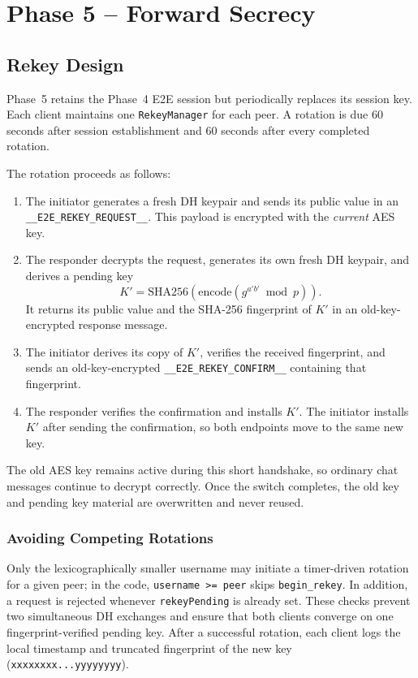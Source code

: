 \documentclass[11pt]{article}
\begin{document}
\section{Phase 5 -- Forward Secrecy}

\subsection{Rekey Design}

Phase~5 retains the Phase~4 E2E session but periodically replaces its session key. Each client maintains one \texttt{RekeyManager} for each peer. A rotation is due 60 seconds after session establishment and 60 seconds after every completed rotation.

The rotation proceeds as follows:

\begin{enumerate}
    \item The initiator generates a fresh DH keypair and sends its public value in an \texttt{\_\_E2E\_REKEY\_REQUEST\_\_}. This payload is encrypted with the \emph{current} AES key.
    \item The responder decrypts the request, generates its own fresh DH keypair, and derives a pending key
    \[
    K'=\mathrm{SHA256}(\mathrm{encode}(g^{a'b'}\bmod p)).
    \]
    It returns its public value and the SHA-256 fingerprint of $K'$ in an old-key-encrypted response message.
    \item The initiator derives its copy of $K'$, verifies the received fingerprint, and sends an old-key-encrypted \texttt{\_\_E2E\_REKEY\_CONFIRM\_\_} containing that fingerprint.
    \item The responder verifies the confirmation and installs $K'$. The initiator installs $K'$ after sending the confirmation, so both endpoints move to the same new key.
\end{enumerate}

The old AES key remains active during this short handshake, so ordinary chat messages continue to decrypt correctly. Once the switch completes, the old key and pending key material are overwritten and never reused.

\subsubsection{Avoiding Competing Rotations}

Only the lexicographically smaller username may initiate a timer-driven rotation for a given peer; in the code, \texttt{username >= peer} skips \texttt{begin\_rekey}. In addition, a request is rejected whenever \texttt{rekeyPending} is already set. These checks prevent two simultaneous DH exchanges and ensure that both clients converge on one fingerprint-verified pending key. After a successful rotation, each client logs the local timestamp and truncated fingerprint of the new key (\texttt{xxxxxxxx...yyyyyyyy}).
\end{document}
